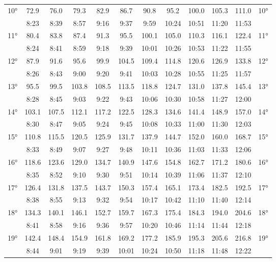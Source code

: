 \begin{footnotesize}
\begin{tabular}{c || c | c | c | c | c | c | c | c | c | c || c}
		\multirow{2}{*}{10°}&72.9&76.0&79.3&82.9&86.7&90.8&95.2&100.0&105.3&111.0&\multirow{2}{*}{10°}\\ \space&8:23&8:39&8:57&9:16&9:37&9:59&10:24&10:51&11:20&11:53&\space\\\hline
		\multirow{2}{*}{11°}&80.4&83.8&87.4&91.3&95.5&100.1&105.0&110.3&116.1&122.4&\multirow{2}{*}{11°}\\ \space&8:24&8:41&8:59&9:18&9:39&10:01&10:26&10:53&11:22&11:55&\space\\\hline
		\multirow{2}{*}{12°}&87.9&91.6&95.6&99.9&104.5&109.4&114.8&120.6&126.9&133.8&\multirow{2}{*}{12°}\\ \space&8:26&8:43&9:00&9:20&9:41&10:03&10:28&10:55&11:25&11:57&\space\\\hline
		\multirow{2}{*}{13°}&95.5&99.5&103.8&108.5&113.5&118.8&124.7&131.0&137.8&145.4&\multirow{2}{*}{13°}\\ \space&8:28&8:45&9:03&9:22&9:43&10:06&10:30&10:58&11:27&12:00&\space\\\hline
		\multirow{2}{*}{14°}&103.1&107.5&112.1&117.2&122.5&128.3&134.6&141.4&148.9&157.0&\multirow{2}{*}{14°}\\ \space&8:30&8:47&9:05&9:24&9:45&10:08&10:33&11:00&11:30&12:03&\space\\\hline
		\multirow{2}{*}{15°}&110.8&115.5&120.5&125.9&131.7&137.9&144.7&152.0&160.0&168.7&\multirow{2}{*}{15°}\\ \space&8:33&8:49&9:07&9:27&9:48&10:11&10:36&11:03&11:33&12:06&\space\\\hline
		\multirow{2}{*}{16°}&118.6&123.6&129.0&134.7&140.9&147.6&154.8&162.7&171.2&180.6&\multirow{2}{*}{16°}\\ \space&8:35&8:52&9:10&9:30&9:51&10:14&10:39&11:06&11:37&12:10&\space\\\hline
		\multirow{2}{*}{17°}&126.4&131.8&137.5&143.7&150.3&157.4&165.1&173.4&182.5&192.5&\multirow{2}{*}{17°}\\ \space&8:38&8:55&9:13&9:32&9:54&10:17&10:42&11:10&11:40&12:14&\space\\\hline
		\multirow{2}{*}{18°}&134.3&140.1&146.1&152.7&159.7&167.3&175.4&184.3&194.0&204.6&\multirow{2}{*}{18°}\\ \space&8:41&8:58&9:16&9:36&9:57&10:20&10:46&11:14&11:44&12:18&\space\\\hline
		\multirow{2}{*}{19°}&142.4&148.4&154.9&161.8&169.2&177.2&185.9&195.3&205.6&216.8&\multirow{2}{*}{19°}\\ \space&8:44&9:01&9:19&9:39&10:01&10:24&10:50&11:18&11:48&12:22&\space\\\hline

\end{tabular}
\end{footnotesize}
